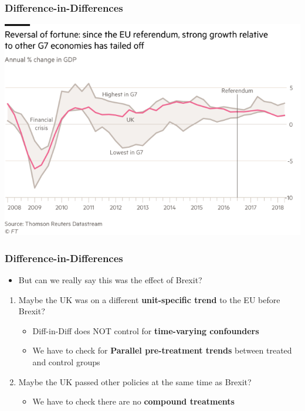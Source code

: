 \documentclass[xcolor=x11names,compress]{beamer}\usepackage[]{graphicx}\usepackage[]{color}
\renewcommand{\(}{\begin{columns}}
\renewcommand{\)}{\end{columns}}
\newcommand{\<}[1]{\begin{column}{#1}}
\renewcommand{\>}{\end{column}}
\begin{document}
\begin{frame}
\frametitle{Difference-in-Differences}
\begin{center}
\includegraphics[scale=0.7]{UK_EU_Growth.png}
\end{center}
\end{frame}

\begin{frame}
\frametitle{Difference-in-Differences}
\begin{itemize}
\item But can we really say this was the effect of Brexit?
\end{itemize}
\pause
\begin{enumerate}
\item Maybe the UK was on a different \textbf{unit-specific trend} to the EU before Brexit?
\pause
\begin{itemize}
\item Diff-in-Diff does NOT control for \textbf{time-varying confounders}
\pause
\item We have to check for \textbf{Parallel pre-treatment trends} between treated and control groups
\pause
\end{itemize}
\item Maybe the UK passed other policies at the same time as Brexit?
\pause
\begin{itemize}
\item We have to check there are no \textbf{compound treatments}
\end{itemize}
\end{enumerate}
\end{frame}
\end{document}
